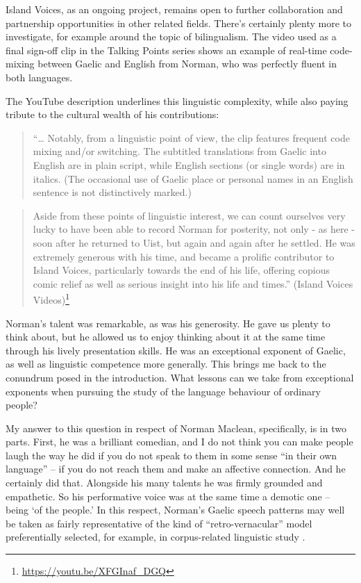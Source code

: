 \documentclass[output=paper,colorlinks,citecolor=brown]{langscibook}
\begin{document}
Island Voices, as an ongoing project, remains open to further collaboration and partnership opportunities in other related fields. There’s certainly plenty more to investigate, for example around the topic of bilingualism. The video used as a final sign-off clip in the Talking Points series shows an example of real-time code-mixing between Gaelic and English from Norman, who was perfectly fluent in both languages. 

The YouTube description underlines this linguistic complexity, while also paying tribute to the cultural wealth of his contributions: 

\begin{quote}
``… Notably, from a linguistic point of view, the clip features frequent code mixing and/or switching. The subtitled translations from Gaelic into English are in plain script, while English sections (or single words) are in italics. (The occasional use of Gaelic place or personal names in an English sentence is not distinctively marked.) 
\end{quote}

\begin{quote}
Aside from these points of linguistic interest, we can count ourselves very lucky to have been able to record Norman for posterity, not only - as here - soon after he returned to Uist, but again and again after he settled. He was extremely generous with his time, and became a prolific contributor to Island Voices, particularly towards the end of his life, offering copious comic relief as well as serious insight into his life and times.” (Island Voices Videos)\footnote{\url{https://youtu.be/XFGInaf_DGQ}} 
\end{quote}

Norman’s talent was remarkable, as was his generosity. He gave us plenty to think about, but he allowed us to enjoy thinking about it at the same time through his lively presentation skills. He was an exceptional exponent of Gaelic, as well as linguistic competence more generally. This brings me back to the conundrum posed in the introduction. What lessons can we take from exceptional exponents when pursuing the study of the language behaviour of ordinary people?

My answer to this question in respect of Norman Maclean, specifically, is in two parts. First, he was a brilliant comedian, and I do not think you can make people laugh the way he did if you do not speak to them in some sense ``in their own language” – if you do not reach them and make an affective connection. And he certainly did that. Alongside his many talents he was firmly grounded and empathetic. So his performative voice was at the same time a demotic one – being `of the people.' In this respect, Norman’s Gaelic speech patterns may well be taken as fairly representative of the kind of “retro\hyp vernacular” model preferentially selected, for example, in corpus-related linguistic study \citep{gw:ÓMaolalaigh2014}.
\end{document}
